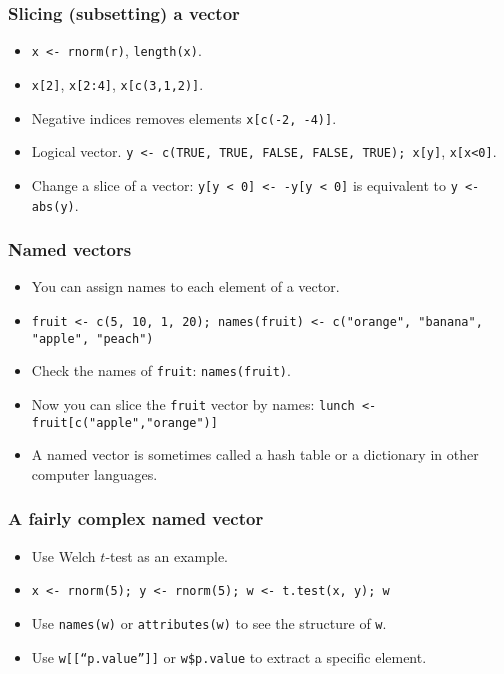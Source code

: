 \begin{frame}
  \frametitle{Slicing (subsetting) a vector}
  \begin{itemize}
  \item \texttt{x <- rnorm(r)}, \texttt{length(x)}.
  \item \texttt{x[2]}, \texttt{x[2:4]}, \texttt{x[c(3,1,2)]}.
  \item Negative indices removes elements \texttt{x[c(-2, -4)]}.
  \item Logical vector. \texttt{y <- c(TRUE, TRUE, FALSE, FALSE,
      TRUE); x[y]}, \texttt{x[x<0]}.
  \item Change a slice of a vector: \texttt{y[y < 0] <- -y[y < 0]} is
    equivalent to \texttt{y <- abs(y)}.
  \end{itemize}
\end{frame}

\begin{frame}
  \frametitle{Named vectors}
  \begin{itemize}
  \item You can assign names to each element of a vector.
  \item \texttt{fruit <- c(5, 10, 1, 20); names(fruit) <- c("orange", "banana", "apple", "peach")}
  \item Check the names of \texttt{fruit}: \texttt{names(fruit)}.
  \item Now you can slice the \texttt{fruit} vector by names:
    \texttt{lunch <- fruit[c("apple","orange")]}
  \item A named vector is sometimes called a hash table or a
    dictionary in other computer languages.
  \end{itemize}
\end{frame}

\begin{frame}
  \frametitle{A fairly complex named vector}
  \begin{itemize}
  \item Use Welch $t$-test as an example.
  \item \texttt{x <- rnorm(5); y <- rnorm(5); w <- t.test(x, y); w}
  \item Use \texttt{names(w)} or \texttt{attributes(w)} to see the
    structure of \texttt{w}.
  \item Use \texttt{w[[``p.value'']]} or \texttt{w\$p.value} to
    extract a specific element.
  \end{itemize}
\end{frame}

